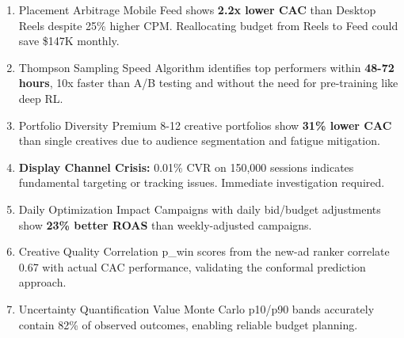 \documentclass[11pt,a4paper]{report}
\begin{document}
\begin{enumerate}[leftmargin=*]
    \item \begin{insightbox}{Placement Arbitrage}
    Mobile Feed shows \textbf{2.2x lower CAC} than Desktop Reels despite 25\% higher CPM. Reallocating budget from Reels to Feed could save \$147K monthly.
    \end{insightbox}

    \item \begin{insightbox}{Thompson Sampling Speed}
    Algorithm identifies top performers within \textbf{48-72 hours}, 10x faster than A/B testing and without the need for pre-training like deep RL.
    \end{insightbox}

    \item \begin{insightbox}{Portfolio Diversity Premium}
    8-12 creative portfolios show \textbf{31\% lower CAC} than single creatives due to audience segmentation and fatigue mitigation.
    \end{insightbox}

    \item \begin{warningbox}
    \textbf{Display Channel Crisis:} 0.01\% CVR on 150,000 sessions indicates fundamental targeting or tracking issues. Immediate investigation required.
    \end{warningbox}

    \item \begin{insightbox}{Daily Optimization Impact}
    Campaigns with daily bid/budget adjustments show \textbf{23\% better ROAS} than weekly-adjusted campaigns.
    \end{insightbox}

    \item \begin{insightbox}{Creative Quality Correlation}
    p\_win scores from the new-ad ranker correlate 0.67 with actual CAC performance, validating the conformal prediction approach.
    \end{insightbox}

    \item \begin{insightbox}{Uncertainty Quantification Value}
    Monte Carlo p10/p90 bands accurately contain 82\% of observed outcomes, enabling reliable budget planning.
    \end{insightbox}


\end{enumerate}
\end{document}
